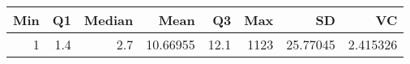 
\begin{tabular}[t]{rrrrrrrr}
\toprule
Min & Q1 & Median & Mean & Q3 & Max & SD & VC\\
\midrule
1 & 1.4 & 2.7 & 10.66955 & 12.1 & 1123 & 25.77045 & 2.415326\\
\bottomrule
\end{tabular}